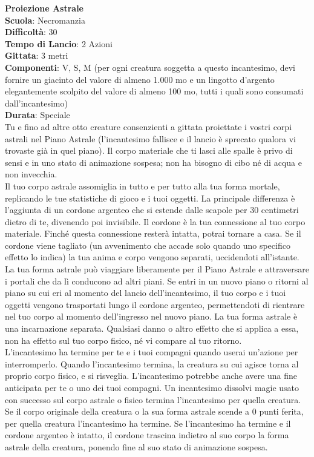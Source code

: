 \begin{multicols}{2}
\medskip\textbf{Proiezione Astrale}\\
\textbf{Scuola}: Necromanzia\\
\textbf{Difficoltà}: 30\\
\textbf{Tempo di Lancio}: 2 Azioni\\
\textbf{Gittata}: 3 metri\\
\textbf{Componenti}: V, S, M (per ogni creatura soggetta a questo incantesimo, devi fornire un giacinto del valore di almeno 1.000 mo e un lingotto d'argento elegantemente scolpito del valore di almeno 100 mo, tutti i quali sono consumati dall'incantesimo)\\
\textbf{Durata}: Speciale\\
Tu e fino ad altre otto creature consenzienti a gittata proiettate i vostri corpi astrali nel Piano Astrale (l'incantesimo fallisce e il lancio è sprecato qualora vi trovaste già in quel piano). Il corpo materiale che ti lasci alle spalle è privo di sensi e in uno stato di animazione sospesa; non ha bisogno di cibo né di acqua e non invecchia.\\
Il tuo corpo astrale assomiglia in tutto e per tutto alla tua forma mortale, replicando le tue statistiche di gioco e i tuoi oggetti. La principale differenza è l'aggiunta di un cordone argenteo che si estende dalle scapole per 30 centimetri dietro di te, divenendo poi invisibile. Il cordone è la tua connessione al tuo corpo materiale. Finché questa connessione resterà intatta, potrai tornare a casa. Se il cordone viene tagliato (un avvenimento che accade solo quando uno specifico effetto lo indica) la tua anima e corpo vengono separati, uccidendoti all'istante.\\
La tua forma astrale può viaggiare liberamente per il Piano Astrale e attraversare i portali che da lì conducono ad altri piani. Se entri in un nuovo piano o ritorni al piano su cui eri al momento del lancio dell'incantesimo, il tuo corpo e i tuoi oggetti vengono trasportati lungo il cordone argenteo, permettendoti di rientrare nel tuo corpo al momento dell'ingresso nel nuovo piano. La tua forma astrale è una incarnazione separata. Qualsiasi danno o altro effetto che si applica a essa, non ha effetto sul tuo corpo fisico, né vi compare al tuo ritorno.\\
L'incantesimo ha termine per te e i tuoi compagni quando userai un'azione per interromperlo. Quando l'incantesimo termina, la creatura su cui agisce torna al proprio corpo fisico, e si risveglia. L'incantesimo potrebbe anche avere una fine anticipata per te o uno dei tuoi compagni. Un incantesimo dissolvi magie usato con successo sul corpo astrale o fisico termina l'incantesimo per quella creatura. Se il corpo originale della creatura o la sua forma astrale scende a 0 punti ferita, per quella creatura l'incantesimo ha termine. Se l'incantesimo ha termine e il cordone argenteo è intatto, il cordone trascina indietro al suo corpo la forma astrale della creatura, ponendo fine al suo stato di animazione sospesa.\\

\end{multicols}
